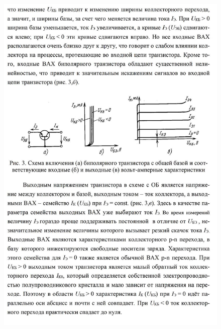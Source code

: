 \documentclass[a4paper,14pt]{article}
\begin{document}
\begin{figure}[H]
	\centering
	\includegraphics[width=\linewidth]{images/theory_5}
	\caption*{}
\end{figure}
\end{document}
